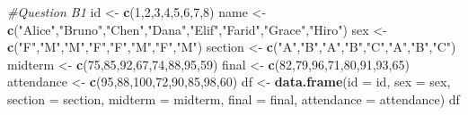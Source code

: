\documentclass[
]{article}
\newenvironment{Shaded}{\begin{snugshade}}{\end{snugshade}}
\newcommand{\AttributeTok}[1]{\textcolor[rgb]{0.13,0.29,0.53}{#1}}
\newcommand{\CommentTok}[1]{\textcolor[rgb]{0.56,0.35,0.01}{\textit{#1}}}
\newcommand{\DecValTok}[1]{\textcolor[rgb]{0.00,0.00,0.81}{#1}}
\newcommand{\FunctionTok}[1]{\textcolor[rgb]{0.13,0.29,0.53}{\textbf{#1}}}
\newcommand{\NormalTok}[1]{#1}
\newcommand{\OtherTok}[1]{\textcolor[rgb]{0.56,0.35,0.01}{#1}}
\newcommand{\StringTok}[1]{\textcolor[rgb]{0.31,0.60,0.02}{#1}}
\begin{document}
\begin{Shaded}
\begin{Highlighting}[]
\CommentTok{\#Question B1}
\NormalTok{id }\OtherTok{\textless{}{-}} \FunctionTok{c}\NormalTok{(}\DecValTok{1}\NormalTok{,}\DecValTok{2}\NormalTok{,}\DecValTok{3}\NormalTok{,}\DecValTok{4}\NormalTok{,}\DecValTok{5}\NormalTok{,}\DecValTok{6}\NormalTok{,}\DecValTok{7}\NormalTok{,}\DecValTok{8}\NormalTok{)}
\NormalTok{name }\OtherTok{\textless{}{-}} \FunctionTok{c}\NormalTok{(}\StringTok{"Alice"}\NormalTok{,}\StringTok{"Bruno"}\NormalTok{,}\StringTok{"Chen"}\NormalTok{,}\StringTok{"Dana"}\NormalTok{,}\StringTok{"Elif"}\NormalTok{,}\StringTok{"Farid"}\NormalTok{,}\StringTok{"Grace"}\NormalTok{,}\StringTok{"Hiro"}\NormalTok{)}
\NormalTok{sex }\OtherTok{\textless{}{-}} \FunctionTok{c}\NormalTok{(}\StringTok{"F"}\NormalTok{,}\StringTok{"M"}\NormalTok{,}\StringTok{"M"}\NormalTok{,}\StringTok{"F"}\NormalTok{,}\StringTok{"F"}\NormalTok{,}\StringTok{"M"}\NormalTok{,}\StringTok{"F"}\NormalTok{,}\StringTok{"M"}\NormalTok{)}
\NormalTok{section }\OtherTok{\textless{}{-}} \FunctionTok{c}\NormalTok{(}\StringTok{"A"}\NormalTok{,}\StringTok{"B"}\NormalTok{,}\StringTok{"A"}\NormalTok{,}\StringTok{"B"}\NormalTok{,}\StringTok{"C"}\NormalTok{,}\StringTok{"A"}\NormalTok{,}\StringTok{"B"}\NormalTok{,}\StringTok{"C"}\NormalTok{)}
\NormalTok{midterm }\OtherTok{\textless{}{-}} \FunctionTok{c}\NormalTok{(}\DecValTok{75}\NormalTok{,}\DecValTok{85}\NormalTok{,}\DecValTok{92}\NormalTok{,}\DecValTok{67}\NormalTok{,}\DecValTok{74}\NormalTok{,}\DecValTok{88}\NormalTok{,}\DecValTok{95}\NormalTok{,}\DecValTok{59}\NormalTok{)}
\NormalTok{final }\OtherTok{\textless{}{-}} \FunctionTok{c}\NormalTok{(}\DecValTok{82}\NormalTok{,}\DecValTok{79}\NormalTok{,}\DecValTok{96}\NormalTok{,}\DecValTok{71}\NormalTok{,}\DecValTok{80}\NormalTok{,}\DecValTok{91}\NormalTok{,}\DecValTok{93}\NormalTok{,}\DecValTok{65}\NormalTok{)}
\NormalTok{attendance }\OtherTok{\textless{}{-}} \FunctionTok{c}\NormalTok{(}\DecValTok{95}\NormalTok{,}\DecValTok{88}\NormalTok{,}\DecValTok{100}\NormalTok{,}\DecValTok{72}\NormalTok{,}\DecValTok{90}\NormalTok{,}\DecValTok{85}\NormalTok{,}\DecValTok{98}\NormalTok{,}\DecValTok{60}\NormalTok{)}
\NormalTok{df }\OtherTok{\textless{}{-}} \FunctionTok{data.frame}\NormalTok{(}\AttributeTok{id =}\NormalTok{ id, }\AttributeTok{sex =}\NormalTok{ sex, }\AttributeTok{section =}\NormalTok{ section, }\AttributeTok{midterm =}\NormalTok{ midterm, }\AttributeTok{final =}\NormalTok{ final, }\AttributeTok{attendance =}\NormalTok{ attendance)}
\NormalTok{df}
\end{Highlighting}
\end{Shaded}
\end{document}
